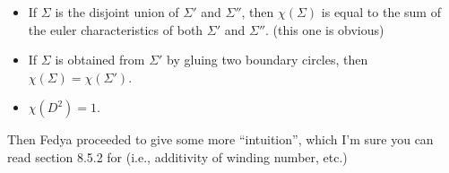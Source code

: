 \begin{itemize}
    \item If $\Sigma$ is the disjoint union of $\Sigma'$ and $\Sigma''$, then $\chi(\Sigma)$ is equal to the sum of the euler characteristics of both $\Sigma'$ and $\Sigma''$. (this one is obvious)
    \item If $\Sigma$ is obtained from $\Sigma'$ by gluing two boundary circles, then $\chi(\Sigma) = \chi(\Sigma')$.
    \item $\chi(D^2) = 1$.
\end{itemize}
Then Fedya proceeded to give some more ``intuition'', which I'm sure you can read section 8.5.2 for (i.e., additivity of winding number, etc.)